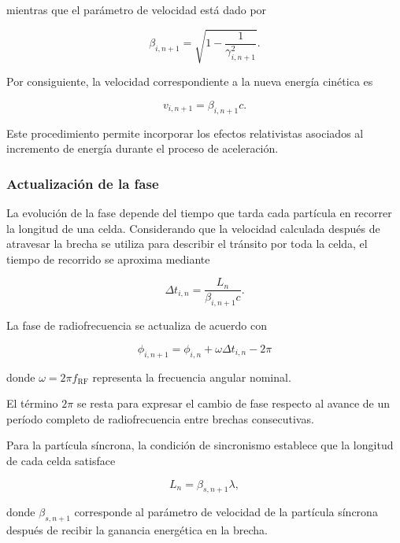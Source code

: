 mientras que el parámetro de velocidad está dado por

\begin{equation}
    \beta_{i,n+1}
    =
    \sqrt{1-\frac{1}{\gamma_{i,n+1}^{2}}}.
\end{equation}

Por consiguiente, la velocidad correspondiente a la nueva energía cinética es

\begin{equation}
    v_{i,n+1}=\beta_{i,n+1}c.
\end{equation}

Este procedimiento permite incorporar los efectos relativistas asociados al incremento de energía durante el proceso de aceleración.

\subsubsection*{Actualización de la fase}

La evolución de la fase depende del tiempo que tarda cada partícula en recorrer la longitud de una celda. Considerando que la velocidad calculada después de atravesar la brecha se utiliza para describir el tránsito por toda la celda, el tiempo de recorrido se aproxima mediante

\begin{equation}
    \Delta t_{i,n}
    =
    \frac{L_n}{\beta_{i,n+1}c}.
\end{equation}

La fase de radiofrecuencia se actualiza de acuerdo con

\begin{equation}
    \boxed{
    \phi_{i,n+1}
    =
    \phi_{i,n}
    +
    \omega\Delta t_{i,n}
    -
    2\pi
    }
\end{equation}

donde $\omega=2\pi f_{\mathrm{RF}}$ representa la frecuencia angular nominal.

El término $2\pi$ se resta para expresar el cambio de fase respecto al avance de un período completo de radiofrecuencia entre brechas consecutivas.

Para la partícula síncrona, la condición de sincronismo establece que la longitud de cada celda satisface

\begin{equation}
    L_n=\beta_{s,n+1}\lambda,
\end{equation}

donde $\beta_{s,n+1}$ corresponde al parámetro de velocidad de la partícula síncrona después de recibir la ganancia energética en la brecha.

